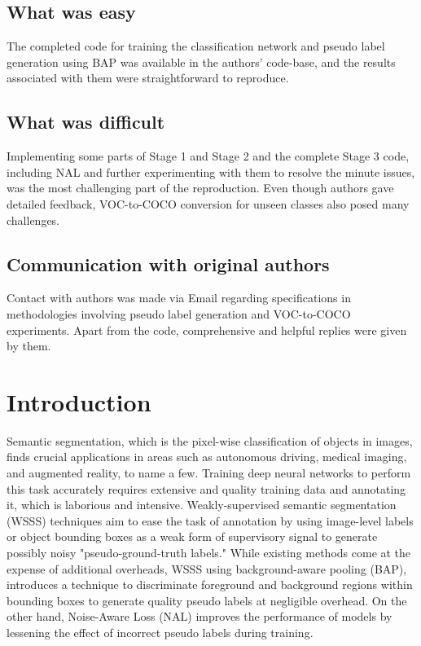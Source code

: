 \subsection*{What was easy}
The completed code for training the classification network and pseudo label generation using BAP was available in the authors' code-base, and the results associated with them were straightforward to reproduce. 

\subsection*{What was difficult}
Implementing some parts of Stage 1 and Stage 2 and the complete Stage 3 code, including NAL and further experimenting with them to resolve the minute issues, was the most challenging part of the reproduction. Even though authors gave detailed feedback, VOC-to-COCO conversion for unseen classes also posed many challenges.

\subsection*{Communication with original authors}

Contact with authors was made via Email regarding specifications in methodologies involving pseudo label generation and VOC-to-COCO experiments. Apart from the code, comprehensive and helpful replies were given by them.


\section{Introduction}
Semantic segmentation, which is the pixel-wise classification of objects in images, finds crucial applications in areas such as autonomous driving, medical imaging, and augmented reality, to name a few. Training deep neural networks to perform this task accurately requires extensive and quality training data and annotating it, which is laborious and intensive. Weakly-supervised semantic segmentation (WSSS) techniques aim to ease the task of annotation by using image-level labels or object bounding boxes as a weak form of supervisory signal to generate possibly noisy "pseudo-ground-truth labels." While existing methods come at the expense of additional overheads, WSSS using background-aware pooling (BAP), introduces a technique to discriminate foreground and background regions within bounding boxes to generate quality pseudo labels at negligible overhead. On the other hand, Noise-Aware Loss (NAL) improves the performance of models by lessening the effect of incorrect pseudo labels during training.

